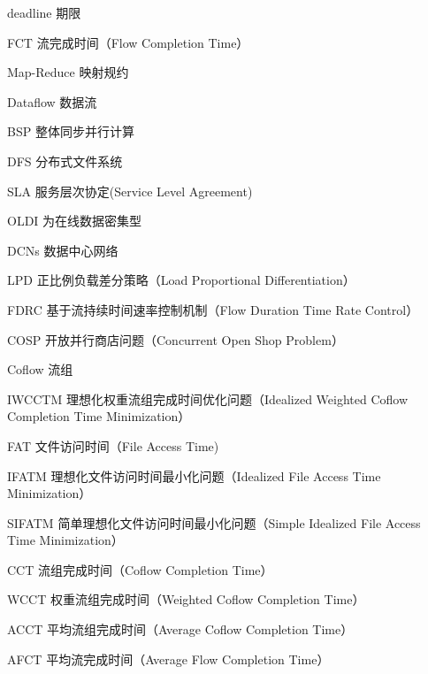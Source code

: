 \begin{denotation}[3cm]
\item[deadline] 期限
\item[FCT] 流完成时间（Flow Completion Time）
\item[Map-Reduce] 映射规约
\item[Dataflow] 数据流
\item[BSP] 整体同步并行计算
\item[DFS] 分布式文件系统
\item[SLA] 服务层次协定(Service Level Agreement)
\item[OLDI] 为在线数据密集型
\item[DCNs] 数据中心网络
\item[LPD] 正比例负载差分策略（Load Proportional Differentiation）
\item[FDRC] 基于流持续时间速率控制机制（Flow Duration Time Rate Control）
\item[COSP] 开放并行商店问题（Concurrent Open Shop Problem）
\item[Coflow] 流组
\item[IWCCTM] 理想化权重流组完成时间优化问题（Idealized Weighted Coflow Completion Time Minimization）
\item[FAT] 文件访问时间（File Access Time)
\item[IFATM] 理想化文件访问时间最小化问题（Idealized File Access Time Minimization）
\item[SIFATM] 简单理想化文件访问时间最小化问题（Simple Idealized File Access Time Minimization）
\item[CCT] 流组完成时间（Coflow Completion Time）
\item[WCCT] 权重流组完成时间（Weighted Coflow Completion Time）
\item[ACCT] 平均流组完成时间（Average Coflow Completion Time）
\item[AFCT] 平均流完成时间（Average Flow Completion Time）
\end{denotation}
